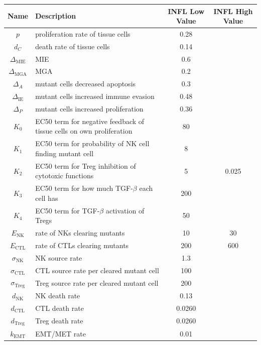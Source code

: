 \documentclass[11pt, a4paper, preprint]{article}
\begin{document}
\begin{table}[H]
\begin{center}
 \begin{tabular}{|| c | p{7cm} | c | c ||} 
 \hline
 Name & Description & INFL Low Value & INFL High Value  \\ [0.5ex] 
 \hline\hline
  $p$ & proliferation rate of tissue cells & 0.28 & \\ 
 \hline
 $d_C$  & death rate of tissue cells & 0.14 & \\
 \hline
$\Delta_\text{MIE}$ &  MIE & 0.6 & \\
 \hline
 $\Delta_\text{MGA}$ & MGA  & 0.2 &  \\
 \hline
  $\Delta_A$ & mutant cells decreased apoptosis & 0.3 &  \\
  \hline
  $\Delta_\text{IE}$ & mutant cells increased immune evasion & 0.48 &  \\
  \hline
  $\Delta_P$ & mutant cells increased proliferation & 0.36 &  \\
  \hline
 $K_0$ & EC50 term for negative feedback of tissue cells on own proliferation & 80 & \\
 \hline
 $K_1$ & EC50 term for probability of NK cell finding mutant cell & 8 & \\
 \hline
  $K_2$ & EC50 term for Treg inhibition of cytotoxic functions & 5 & 0.025  \\
  \hline
  $K_3$ & EC50 term for how much TGF-$\beta$ each cell has & 200 & \\
  \hline
  $K_4$ & EC50 term for TGF-$\beta$ activation of Tregs & 50 & \\
  \hline
 $E_\text{NK}$ & rate of NKs clearing mutants & 10 & 30  \\
  \hline
  $E_\text{CTL}$ & rate of CTLs clearing mutants & 200 & 600 \\
  \hline
  $\sigma_\text{NK}$ & NK source rate & 1.3 &  \\ 
  \hline
  $\sigma_\text{CTL}$ & CTL source rate per cleared mutant cell & 100 & \\ 
  \hline
  $\sigma_\text{Treg}$ & Treg source rate per cleared mutant cell & 200 & \\ 
  \hline
  $d_\text{NK}$ & NK death rate & 0.13 &  \\ 
  \hline
  $d_\text{CTL}$ & CTL death rate & 0.0260 & \\ 
  \hline
  $d_\text{Treg}$ & Treg death rate & 0.0260 & \\ 
  \hline
  $k_\text{EMT}$ & EMT/MET rate & 0.01 & \\

\end{tabular}
\end{center}
\end{table}
\end{document}
